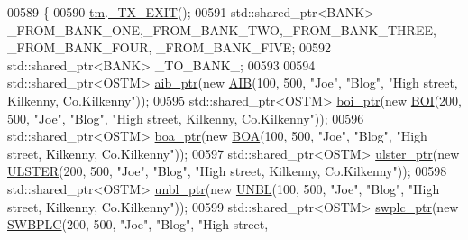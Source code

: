\begin{DoxyCode}
00589                                                                    \{
00590     \hyperlink{class_my_test_c_ase_a422e6e5d4ddedea384be96031c89b72b_a422e6e5d4ddedea384be96031c89b72b}{tm}.\hyperlink{class_t_m_a5e2d1127f2429f2f524d25f430eade06_a5e2d1127f2429f2f524d25f430eade06}{\_TX\_EXIT}();
00591     std::shared\_ptr<BANK> \_FROM\_BANK\_ONE,\_FROM\_BANK\_TWO,\_FROM\_BANK\_THREE, \_FROM\_BANK\_FOUR, \_FROM\_BANK\_FIVE;
00592     std::shared\_ptr<BANK> \_TO\_BANK\_;
00593     
00594     std::shared\_ptr<OSTM> \hyperlink{class_my_test_c_ase_adad50e8278b64aa0321000b528e5362c_adad50e8278b64aa0321000b528e5362c}{aib\_ptr}(\textcolor{keyword}{new} \hyperlink{class_a_i_b}{AIB}(100, 500, \textcolor{stringliteral}{"Joe"}, \textcolor{stringliteral}{"Blog"}, \textcolor{stringliteral}{"High street, Kilkenny,
       Co.Kilkenny"}));
00595     std::shared\_ptr<OSTM> \hyperlink{class_my_test_c_ase_a5554de9e3e6393a89c66c036c529720b_a5554de9e3e6393a89c66c036c529720b}{boi\_ptr}(\textcolor{keyword}{new} \hyperlink{class_b_o_i}{BOI}(200, 500, \textcolor{stringliteral}{"Joe"}, \textcolor{stringliteral}{"Blog"}, \textcolor{stringliteral}{"High street, Kilkenny,
       Co.Kilkenny"}));
00596     std::shared\_ptr<OSTM> \hyperlink{class_my_test_c_ase_ae0b2db5d35e25b3139beeda0705494f0_ae0b2db5d35e25b3139beeda0705494f0}{boa\_ptr}(\textcolor{keyword}{new} \hyperlink{class_b_o_a}{BOA}(100, 500, \textcolor{stringliteral}{"Joe"}, \textcolor{stringliteral}{"Blog"}, \textcolor{stringliteral}{"High street, Kilkenny,
       Co.Kilkenny"}));
00597     std::shared\_ptr<OSTM> \hyperlink{class_my_test_c_ase_a4f9f72374d3d15be7cdf16412c4d7ed3_a4f9f72374d3d15be7cdf16412c4d7ed3}{ulster\_ptr}(\textcolor{keyword}{new} \hyperlink{class_u_l_s_t_e_r}{ULSTER}(200, 500, \textcolor{stringliteral}{"Joe"}, \textcolor{stringliteral}{"Blog"}, \textcolor{stringliteral}{"High street,
       Kilkenny, Co.Kilkenny"}));
00598     std::shared\_ptr<OSTM> \hyperlink{class_my_test_c_ase_a0ca634b597d6c0e136d632268853d5a7_a0ca634b597d6c0e136d632268853d5a7}{unbl\_ptr}(\textcolor{keyword}{new} \hyperlink{class_u_n_b_l}{UNBL}(100, 500, \textcolor{stringliteral}{"Joe"}, \textcolor{stringliteral}{"Blog"}, \textcolor{stringliteral}{"High street, Kilkenny,
       Co.Kilkenny"}));
00599     std::shared\_ptr<OSTM> \hyperlink{class_my_test_c_ase_aa8ccae9a5a7feb5bc47591c55a82d0cd_aa8ccae9a5a7feb5bc47591c55a82d0cd}{swplc\_ptr}(\textcolor{keyword}{new} \hyperlink{class_s_w_b_p_l_c}{SWBPLC}(200, 500, \textcolor{stringliteral}{"Joe"}, \textcolor{stringliteral}{"Blog"}, \textcolor{stringliteral}{"High street,
}
\end{DoxyCode}
